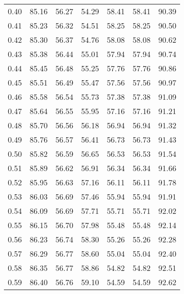 \begin{tabular}{|c|c|c|c|c|c|c|}
      0.40 &     85.16 &     56.27 &      54.29 &   58.41 &      58.41 &         90.39 \\
      0.41 &     85.23 &     56.32 &      54.51 &   58.25 &      58.25 &         90.50 \\
      0.42 &     85.30 &     56.37 &      54.76 &   58.08 &      58.08 &         90.62 \\
      0.43 &     85.38 &     56.44 &      55.01 &   57.94 &      57.94 &         90.74 \\
      0.44 &     85.45 &     56.48 &      55.25 &   57.76 &      57.76 &         90.86 \\
      0.45 &     85.51 &     56.49 &      55.47 &   57.56 &      57.56 &         90.97 \\
      0.46 &     85.58 &     56.54 &      55.73 &   57.38 &      57.38 &         91.09 \\
      0.47 &     85.64 &     56.55 &      55.95 &   57.16 &      57.16 &         91.21 \\
      0.48 &     85.70 &     56.56 &      56.18 &   56.94 &      56.94 &         91.32 \\
      0.49 &     85.76 &     56.57 &      56.41 &   56.73 &      56.73 &         91.43 \\
      0.50 &     85.82 &     56.59 &      56.65 &   56.53 &      56.53 &         91.54 \\
      0.51 &     85.89 &     56.62 &      56.91 &   56.34 &      56.34 &         91.66 \\
      0.52 &     85.95 &     56.63 &      57.16 &   56.11 &      56.11 &         91.78 \\
      0.53 &     86.03 &     56.69 &      57.46 &   55.94 &      55.94 &         91.91 \\
      0.54 &     86.09 &     56.69 &      57.71 &   55.71 &      55.71 &         92.02 \\
      0.55 &     86.15 &     56.70 &      57.98 &   55.48 &      55.48 &         92.14 \\
      0.56 &     86.23 &     56.74 &      58.30 &   55.26 &      55.26 &         92.28 \\
      0.57 &     86.29 &     56.77 &      58.60 &   55.04 &      55.04 &         92.40 \\
      0.58 &     86.35 &     56.77 &      58.86 &   54.82 &      54.82 &         92.51 \\
      0.59 &     86.40 &     56.76 &      59.10 &   54.59 &      54.59 &         92.62 \\

\end{tabular}
